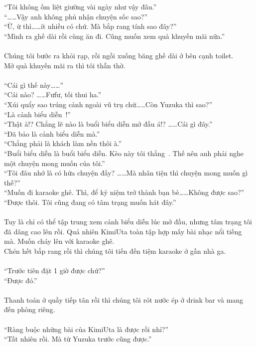 \documentclass[12pt,a4paper, twosides]{book}
\begin{document}
“Tôi không ốm liệt giường vài ngày như vậy đâu.”\\
“……Vậy anh không phủ nhận chuyện sốc sao?”\\
“Ừ, ừ thì……ít nhiều có chứ. Mà bắp rang tính sao đây?”\\
“Mình ra ghế dài rồi cùng ăn đi. Cũng muốn xem quà khuyến mãi nữa.”\\
\\
Chúng tôi bước ra khỏi rạp, rồi ngồi xuống băng ghế dài ở bên cạnh toilet.\\
Mở quà khuyến mãi ra thì tôi thẫn thờ.\\
\\
“Cái gì thế này……”\\
“Cái nào? ……Fưfư, tối thui ha.”\\
“Xúi quẩy sao trúng cảnh ngoài vũ trụ chứ……Còn Yuzuka thì sao?”\\
“Là cảnh biểu diễn~!”\\
“Thật à!? Chẳng lẽ nào là buổi biểu diễn mở đầu á!? ……Cái gì đây.”\\
“Đã bảo là cảnh biểu diễn mà.”\\
“Chẳng phải là khách làm nền thôi à.”\\
“Buổi biểu diễn là buổi biểu diễn. Kèo này tôi thắng~. Thế nên anh phải nghe một chuyện mong muốn của tôi.”\\
“Tôi đâu nhớ là có hứa chuyện đấy? ……Mà nhân tiện thì chuyện mong muốn gì thế?”\\
“Muốn đi karaoke ghê. Thì, để kỷ niệm trở thành bạn bè……Không được sao?”\\
“Được thôi. Tôi cũng đang có tâm trạng muốn hát đây.”\\
\\
Tuy là chỉ có thể tập trung xem cảnh biểu diễn lúc mở đầu, nhưng tâm trạng tôi đã dâng cao lên rồi. Quả nhiên KimiUta toàn tập hợp mấy bài nhạc nổi tiếng mà. Muốn cháy lên với karaoke ghê.\\
Chén hết bắp rang rồi thì chúng tôi tiến đến tiệm karaoke ở gần nhà ga.\\
\\
“Trước tiên đặt 1 giờ được chứ?”\\
“Được đó.”\\
\\
Thanh toán ở quầy tiếp tân rồi thì chúng tôi rót nước ép ở drink bar và mang đến phòng riêng.\\
\\
“Ràng buộc những bài của KimiUta là được rồi nhỉ?”\\
“Tất nhiên rồi. Mà từ Yuzuka trước cũng được.”\\
\end{document}
